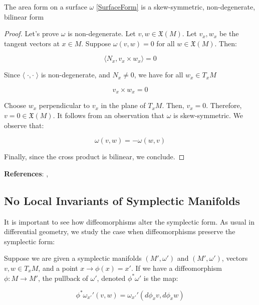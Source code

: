 \begin{lemma}
The area form on a surface $\omega$ \ref{SurfaceForm} is a skew-symmetric, non-degenerate, bilinear form
\end{lemma}

\begin{proof}
Let's prove $\omega$ is non-degenerate. Let $v, w \in \mathfrak{X}(M)$. Let $v_{x}, w_{x}$ be the tangent vectors at $x \in M$. Suppose $\omega(v, w) = 0$ for all $w \in \mathfrak{X}(M)$. Then:

$$\langle N_{x}, v_{x} \times w_{x} \rangle = 0$$

\noindent Since $\langle \; \cdot, \cdot \; \rangle$ is non-degenerate, and $N_{x} \neq 0$, we have for all $w_{x} \in T_{x} M$

$$v_{x} \times w_{x} = 0$$

\noindent Choose $w_{x}$ perpendicular to $v_{x}$ in the plane of $T_{x} M$. Then, $v_{x} = 0$. Therefore, $v = 0 \in \mathfrak{X}(M)$. It follows from an observation that $\omega$ is skew-symmetric. We observe that:

$$\omega(v,w) = -\omega(w,v)$$

\noindent Finally, since the cross product is bilinear, we conclude. 
\end{proof}

\noindent \textbf{References}: \textcite{Terek2020}, \textcite{Bjorn2018}

\subsection{No Local Invariants of Symplectic Manifolds}

It is important to see how diffeomorphisms alter the symplectic form. As usual in differential geometry, we study the case when diffeomorphisms preserve the symplectic form:

\begin{defn}
Suppose we are given a symplectic manifolds $(M', \omega')$ and $(M', \omega')$, vectors $v, w \in T_{x} M$, and a point $x \to \phi(x) = x'$. If we have a diffeomorphism $\phi: M \to M'$, the pullback of $\omega'$, denoted $\phi^{*} \omega'$ is the map:

$$\phi^{*} \omega_{x'}'(v,w) = \omega_{x'}'(d \phi_{x} v, d \phi_{x} w)$$
\end{defn}

